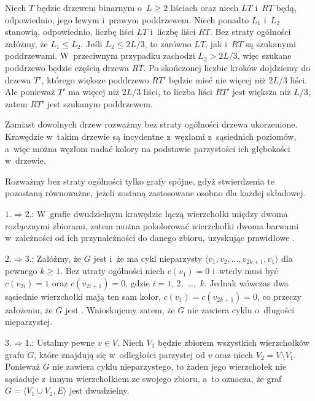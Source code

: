 \noindent Niech $T$ będzie drzewem binarnym o~$L\ge2$ liściach oraz niech $LT$ i~$RT$ będą, odpowiednio, jego lewym i~prawym poddrzewem. Niech ponadto $L_1$ i~$L_2$ stanowią, odpowiednio, liczbę liści $LT$ i~liczbę liści $RT$. Bez straty ogólności załóżmy, że $L_1\le L_2$. Jeśli $L_2\le2L/3$, to zarówno $LT$, jak i~$RT$ są szukanymi poddrzewami. W~przeciwnym przypadku zachodzi $L_2>2L/3$, więc szukane poddrzewo będzie częścią drzewa $RT$. Po skończonej liczbie kroków dojdziemy do drzewa $T'$, którego większe poddrzewo $RT'$ będzie mieć nie więcej niż $2L/3$ liści. Ale ponieważ $T'$ ma więcej niż $2L/3$ liści, to liczba liści $RT'$ jest większa niż $L/3$, zatem $RT'$ jest szukanym poddrzewem.

\problems


\subproblem %
Zamiast dowolnych drzew rozważmy bez straty ogólności drzewa ukorzenione. Krawędzie w~takim drzewie są incydentne z~węzłami z~sąsiednich poziomów, a~więc można węzłom nadać kolory na podstawie parzystości ich głębokości w~drzewie.

\subproblem %
Rozważmy bez straty ogólności tylko grafy spójne, gdyż stwierdzenia te pozostaną równoważne, jeżeli zostaną zastosowane osobno dla każdej składowej.
\medskip

$1.\Rightarrow 2.$: W~grafie dwudzielnym krawędzie łączą wierzchołki między dwoma rozłącznymi zbiorami, zatem można pokolorować wierzchołki dwoma barwami w~zależności od ich przynależności do danego zbioru, uzyskując prawidłowe .
\medskip

$2.\Rightarrow 3.$: Załóżmy, że $G$ jest  i~że ma cykl nieparzysty $\langle v_1,v_2,\dots,v_{2k+1},v_1\rangle$ dla pewnego $k\ge1$. Bez utraty ogólności niech $c(v_1)=0$ i~wtedy musi być $c(v_{2i})=1$ oraz $c(v_{2i+1})=0$, gdzie $i=1$, 2,~\dots,~$k$. Jednak wówczas dwa sąsiednie wierzchołki mają ten sam kolor, $c(v_1)=c(v_{2k+1})=0$, co przeczy założeniu, że $G$ jest . Wnioskujemy zatem, że $G$ nie zawiera cyklu o~długości nieparzystej.
\medskip

$3.\Rightarrow 1.$: Ustalmy pewne $v\in V$. Niech $V_1$ będzie zbiorem wszystkich wierzchołków grafu $G$, które znajdują się w~odległości parzystej od $v$ oraz niech $V_2=V\setminus V_1$. Ponieważ $G$ nie zawiera cyklu nieparzystego, to żaden jego wierzchołek nie sąsiaduje z~innym wierzchołkiem ze swojego zbioru, a~to oznacza, że graf $G=\langle V_1\cup V_2,E\rangle$ jest dwudzielny.

